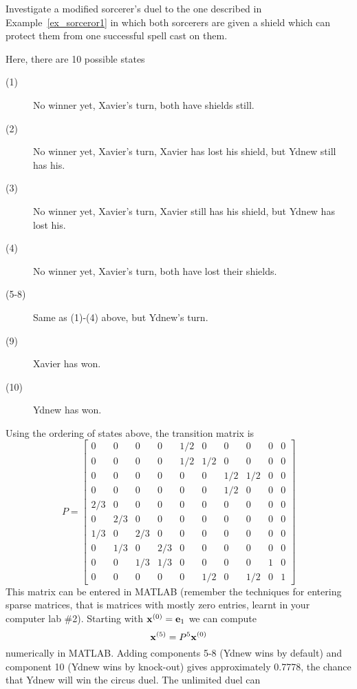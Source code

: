 \begin{example}
\label{ex_sorceror2}
Investigate a modified sorcerer's duel to the one described in 
Example~\ref{ex_sorceror1} in which both sorcerers are given a shield 
which can protect them from one successful spell cast on them. 
{\rm Here, there are 10 possible states 
\begin{description}
\item[(1)] No winner yet, Xavier's turn, both have shields still.
\item[(2)] No winner yet, Xavier's turn, Xavier has lost his shield, 
but Ydnew still has his. 
\item[(3)] No winner yet, Xavier's turn, Xavier still has his shield, 
but Ydnew has lost his. 
\item[(4)] No winner yet, Xavier's turn, both have lost their shields. 
\item[(5-8)] Same as (1)-(4) above, but Ydnew's turn. 
\item[(9)] Xavier has won. 
\item[(10)] Ydnew has won. 
\end{description}
Using the ordering of states above, the transition matrix is 
\[
P = \left[
\begin{array}{cccccccccc}
 0 & 0 & 0 & 0 &1/2& 0 & 0 & 0 & 0 & 0 \\
 0 & 0 & 0 & 0 &1/2&1/2& 0 & 0 & 0 & 0 \\
 0 & 0 & 0 & 0 & 0 & 0 &1/2&1/2& 0 & 0 \\
 0 & 0 & 0 & 0 & 0 & 0 & 1/2 & 0 & 0 & 0 \\
2/3& 0 & 0 & 0 & 0 & 0 & 0 & 0 & 0 & 0 \\
 0 &2/3& 0 & 0 & 0 & 0 & 0 & 0 & 0 & 0 \\
1/3 & 0 &2/3& 0 & 0 & 0 & 0 & 0 & 0 & 0 \\
0 & 1/3  & 0 &2/3& 0 & 0 & 0 & 0 & 0 & 0 \\
 0 & 0 &1/3&1/3& 0 & 0 & 0 & 0 & 1 & 0 \\
 0 & 0 & 0 & 0 & 0 &1/2& 0 & 1/2 & 0 & 1 
\end{array} 
\right]
\]
This matrix can be entered in MATLAB (remember the techniques for entering 
sparse matrices, that is matrices with mostly zero entries, learnt in 
your computer lab \#2). Starting with ${\bf x}^{(0)} = {\bf e}_1$ we can compute
\[
{\bf x}^{(5)} = P^5 {\bf x}^{(0)} 
\]
numerically in MATLAB. Adding components 5-8 (Ydnew wins by default) and 
component 10 (Ydnew wins by knock-out) gives approximately 0.7778, the 
chance that Ydnew will win the circus duel. The unlimited duel can 
}
\end{example}
